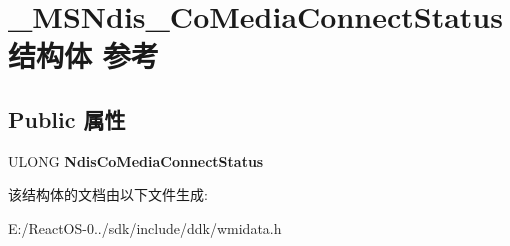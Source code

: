 \hypertarget{struct___m_s_ndis___co_media_connect_status}{}\section{\+\_\+\+M\+S\+Ndis\+\_\+\+Co\+Media\+Connect\+Status结构体 参考}
\label{struct___m_s_ndis___co_media_connect_status}
\subsection*{Public 属性}
\begin{DoxyCompactItemize}
\item 
\mbox{\label{struct___m_s_ndis___co_media_connect_status_a97838b4fc848d0bd31addb9b9b893815}} 
U\+L\+O\+NG {\bfseries Ndis\+Co\+Media\+Connect\+Status}
\end{DoxyCompactItemize}


该结构体的文档由以下文件生成\+:\begin{DoxyCompactItemize}
\item 
E\+:/\+React\+O\+S-\/0../sdk/include/ddk/wmidata.\+h\end{DoxyCompactItemize}
